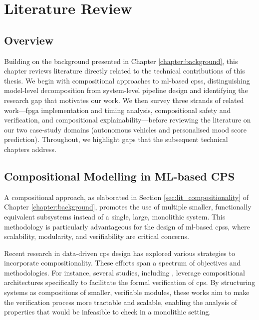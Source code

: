 \chapter{Literature Review}\label{chapter:lit_review}
\glsresetall

\section{Overview}
Building on the background presented in Chapter \ref{chapter:background}, this chapter reviews literature directly related to the technical contributions of this thesis. We begin with compositional approaches to \gls{ml}-based \glspl{cps}, distinguishing model-level decomposition from system-level pipeline design and identifying the research gap that motivates our work. We then survey three strands of related work---\gls{fpga} implementation and timing analysis, compositional safety and verification, and compositional explainability---before reviewing the literature on our two case-study domains (autonomous vehicles and personalised mood score prediction). Throughout, we highlight gaps that the subsequent technical chapters address.


\section{Compositional Modelling in ML-based CPS}
\label{sec:lit_compositional_modelling}

A compositional approach, as elaborated in Section \ref{sec:lit_compositionality} of Chapter \ref{chapter:background}, promotes the use of multiple smaller, functionally equivalent subsystems instead of a single, large, monolithic system. This methodology is particularly advantageous for the design of \gls{ml}-based \glspl{cps}, where scalability, modularity, and verifiability are critical concerns. 

Recent research in data-driven \gls{cps} design has explored various strategies to incorporate compositionality. These efforts span a spectrum of objectives and methodologies. For instance, several studies, including \cite{dreossi_compositional_2018, seshia_formal_2018, dreossi_verifai_2019, naik_robustness_2020}, leverage compositional architectures specifically to facilitate the formal verification of \gls{cps}. By structuring systems as compositions of smaller, verifiable modules, these works aim to make the verification process more tractable and scalable, enabling the analysis of properties that would be infeasible to check in a monolithic setting.

